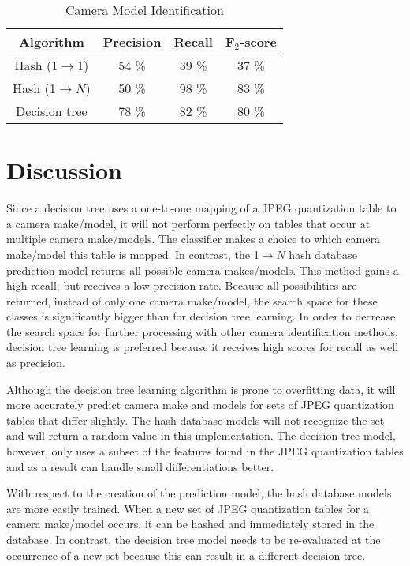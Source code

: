 \begin{table}[h]
\begin{center}
\begin{tabular}{| c| c| c| c|}
\hline
Algorithm & Precision & Recall & F$_2$-score\\
\hline
Hash (1$\rightarrow$1) & 54 \% & 39 \% & 37 \%\\
Hash (1$\rightarrow N$) & 50 \% & 98 \% & 83 \%\\
Decision tree & 78 \% & 82 \% & 80 \% \\
\hline
\end{tabular}
\caption{Camera Model Identification}
\label{tab:fscore_model}
\end{center}

\end{table}


\section{Discussion}

Since a decision tree uses a one-to-one mapping of a JPEG quantization table to a camera make/model, it will not perform perfectly on tables that occur at multiple camera make/models. The classifier makes a choice to which camera make/model this table is mapped. In contrast, the 
1$\rightarrow N$ hash database prediction model returns all possible camera makes/models. This method gains a high recall, but receives a low precision rate. Because all possibilities are returned, instead of only one camera make/model, the search space for these classes is significantly bigger than for decision tree learning. In order to decrease the search space for further processing with other camera identification methods, decision tree learning is preferred because it receives high scores for recall as well as precision.

Although the decision tree learning algorithm is prone to overfitting data, it will more accurately predict camera make and models for sets of JPEG quantization tables that differ slightly. The hash database models will not recognize the set and will return a random value in this implementation. The decision tree model, however, only uses a subset of the features found in the JPEG quantization tables and as a result can handle small differentiations better.

With respect to the creation of the prediction model, the hash database models are more easily trained. When a new set of JPEG quantization tables for a camera make/model occurs, it can be hashed and immediately stored in the database. In contrast, the decision tree model needs to be re-evaluated at the occurrence of a new set because this can result in a different decision tree.


